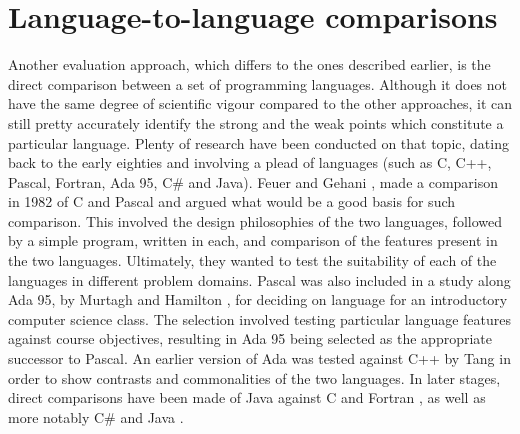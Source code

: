 \section{Language-to-language comparisons}
Another evaluation approach, which differs to the ones described earlier, is the direct comparison between a set of programming languages. Although it does not have the same degree of scientific vigour compared to the other approaches, it can still pretty accurately identify the strong and the weak points which constitute a particular language. Plenty of research have been conducted on that topic, dating back to the early eighties and involving a plead of languages (such as C, C++, Pascal, Fortran, Ada 95, C\# and Java). Feuer and Gehani \cite{CandPascal},  made a comparison in 1982 of C and Pascal and argued what would be a good basis for such comparison. This involved the design philosophies of the two languages, followed by a simple program, written in each, and comparison of the features present in the two languages. Ultimately, they wanted to test the suitability of each of the languages in different problem domains. Pascal was also included in a study along Ada 95, by Murtagh and Hamilton \cite{AdaandPascal}, for deciding on language for an introductory computer science class. The selection involved testing particular language features against course objectives, resulting in Ada 95 being selected as the appropriate successor to Pascal. An earlier version of Ada was tested against C++ by Tang \cite{AdaandCplusplus} in order to show contrasts and commonalities of the two languages. In later stages, direct comparisons have been made of Java against C and Fortran \cite{CandFortranJava}, as well as more notably C\# and Java \cite{JavaCsharp}. 